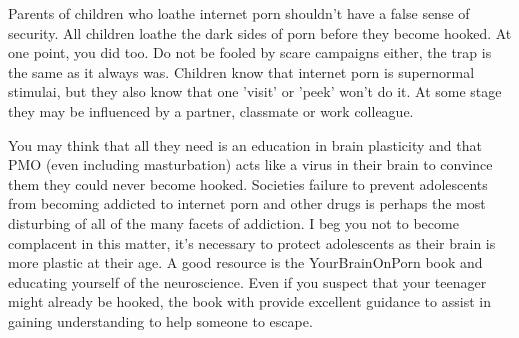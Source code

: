 \documentclass[easypeasy]{subfiles}
\begin{document}
Parents of children who loathe internet porn shouldn't have a false sense of security. All children loathe the dark sides of porn before they become hooked. At one point, you did too. Do not be fooled by scare campaigns either, the trap is the same as it always was. Children know that internet porn is supernormal stimulai, but they also know that one 'visit' or 'peek' won't do it. At some stage they may be influenced by a partner, classmate or work colleague.

You may think that all they need is an education in brain plasticity and that PMO (even including masturbation) acts like a virus in their brain to convince them they could never become hooked. Societies failure to prevent adolescents from becoming addicted to internet porn and other drugs is perhaps the most disturbing of all of the many facets of addiction. I beg you not to become complacent in this matter, it's necessary to protect adolescents as their brain is more plastic at their age. A good resource is the YourBrainOnPorn book and educating yourself of the neuroscience. Even if you suspect that your teenager might already be hooked, the book with provide excellent guidance to assist in gaining understanding to help someone to escape.
\end{document}
